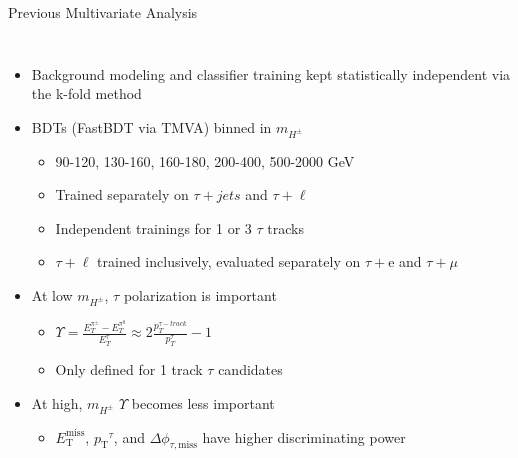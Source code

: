 \documentclass[aspectratio=169,xcolor=table]{beamer}
\newcommand{\Etm}{\ensuremath{E_\text{T}^\text{miss}}\xspace}
\newcommand{\pt}{\ensuremath{p_\text{T}}\xspace}
\begin{document}
    \begin{frame}[t]{Previous Multivariate Analysis}
      \begin{columns}[t]
      \vspace{-1cm}
      \begin{itemize}
        \item Background modeling and classifier training kept statistically independent via the k-fold method
        \item BDTs (FastBDT via TMVA) binned in $m_{H^{\pm}}$
        \begin{itemize}
          \item 90-120, 130-160, 160-180, 200-400, 500-2000 GeV
          \item Trained separately on $\tau + jets$ and $\tau + \ell$
          \item Independent trainings for 1 or 3 $\tau$ tracks
          \item $\tau + \ell$ trained inclusively, evaluated separately on $\tau + \mathrm{e}$ and $\tau + \mu$
        \end{itemize}
        \item At low $m_{H^{\pm}}$, $\tau$ polarization is important
        \begin{itemize}
          \item $\Upsilon = \frac{ E^{\pi^{\pm}}_{T} - E^{\pi^{0}}_{T}}{ E^{\tau}_{T} } \approx 2 \frac{p_{T}^{\tau-track}}{p_{T}^{\tau}}-1$
          \item Only defined for 1 track $\tau$ candidates
        \end{itemize}
        \item At high, $m_{H^{\pm}}$ $\Upsilon$ becomes less important
        \begin{itemize}
          \item \Etm, $\pt^{\tau}$, and $\Delta \phi_{\tau,\mathrm{miss}}$ have higher discriminating power
        \end{itemize}
      \end{itemize}


\end{columns}
\end{frame}
\end{document}
